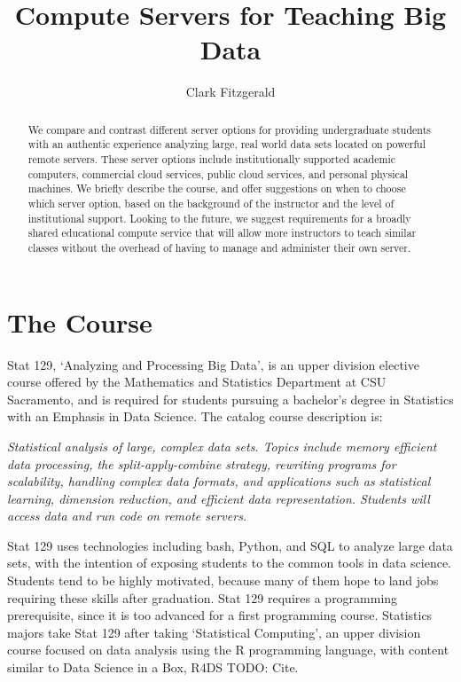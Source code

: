 \documentclass[12pt]{article}
\title{Compute Servers for Teaching Big Data}
\author{Clark Fitzgerald}
\begin{document}
\maketitle

\begin{abstract}

    We compare and contrast different server options for providing undergraduate students with an authentic experience analyzing large, real world data sets located on powerful remote servers.
These server options include institutionally supported academic computers, commercial cloud services, public cloud services, and personal physical machines.
We briefly describe the course, and offer suggestions on when to choose which server option, based on the background of the instructor and the level of institutional support.
Looking to the future, we suggest requirements for a broadly shared educational compute service that will allow more instructors to teach similar classes without the overhead of having to manage and administer their own server.

\end{abstract}




\section{The Course}

Stat 129, `Analyzing and Processing Big Data', is an upper division elective course offered by the Mathematics and Statistics Department at CSU Sacramento, and is required for students pursuing a bachelor's degree in Statistics with an Emphasis in Data Science.
The catalog course description is:

\emph{
Statistical analysis of large, complex data sets. Topics include memory efficient data processing, the split-apply-combine strategy, rewriting programs for scalability, handling complex data formats, and applications such as statistical learning, dimension reduction, and efficient data representation. Students will access data and run code on remote servers.
}

Stat 129 uses technologies including bash, Python, and SQL to analyze large data sets, with the intention of exposing students to the common tools in data science.
Students tend to be highly motivated, because many of them hope to land jobs requiring these skills after graduation.
Stat 129 requires a programming prerequisite, since it is too advanced for a first programming course.
Statistics majors take Stat 129 after taking `Statistical Computing', an upper division course focused on data analysis using the R programming language, with content similar to Data Science in a Box, R4DS TODO: Cite.
\end{document}

